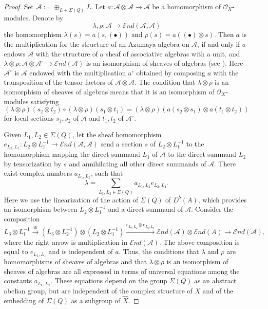 \documentclass[12pt]{amsart}
\numberwithin{equation}{subsection}
\theoremstyle{plain}
\theoremstyle{definition}
\newcommand{\A}{{\mathcal A}}
\newcommand{\IsomRightArrow}{\stackrel{\cong}{\rightarrow}}
\newcommand{\LongRightArrowOf}[1]{\stackrel{#1}{\longrightarrow}}
\newcommand{\StructureSheaf}[1]{{\mathcal O}_{#1}}
\newcommand{\SheafEnd}{{\mathcal E}nd}
\begin{document}
\begin{proof}
Set $\A:=\oplus_{L\in\Sigma(Q)}L$.
Let $a:\A\otimes\A\rightarrow \A$ be a homomorphism of $\StructureSheaf{X}$-modules. Denote by
\[
\lambda, \rho : \A \rightarrow \SheafEnd(\A,\A)
\]
the homomorphism $\lambda(s)=a(s,(\bullet))$ and $\rho(s)=a((\bullet)\otimes s)$. Then $a$ is the multiplication for the structure of an Azumaya algebra on $\A$, if and only if $a$ endows $\A$ with the structure of a sheaf of associative algebras with a unit, and  
$\lambda\otimes \rho:\A\otimes \A^{\circ}\rightarrow \SheafEnd(\A)$ is an isomorphism of sheaves of algebras (see \cite[Proposition IV.2.1]{milne}).
Here $\A^{\circ}$ is $\A$ endowed with the multiplication $a^\circ$ obtained by composing $a$ with the transposition of the tensor factors of $\A\otimes\A$. 
The condition that $\lambda\otimes\rho$ is an isomorphism of sheaves of algebras means that it is an isomorphism of $\StructureSheaf{X}$-modules satisfying 
\[
(\lambda\otimes \rho)(s_2\otimes t_2)\circ (\lambda\otimes \rho)(s_1\otimes t_1)=(\lambda\otimes \rho)(a(s_2\otimes s_1)\otimes a(t_1\otimes t_2))
\]
for local sections $s_1, s_2$ of $\A$ and $t_1, t_2$ of $\A^\circ$.

Given $L_1, L_2\in \Sigma(Q)$, let the sheaf homomorphism $e_{L_2,L_1}:L_2\otimes L_1^{-1}\rightarrow \SheafEnd(\A,\A)$ send a section $s$ of
$L_2\otimes L_1^{-1}$ to the homomorphism mapping the direct summand $L_1$ of $\A$  to the direct summand $L_2$ by tensorization by $s$ and annihilating all other direct summands of $\A$. 
There exist complex numbers $a_{L_1,L_2}$, such that 
\[
\lambda=
\sum_{L_1, L_2\in \Sigma(Q)} a_{L_1,L_2}e_{L_2,L_1}.
\]
Here we use the linearization of the action of $\Sigma(Q)$ of $D^b(A)$, which provides an isomorphism between $L_2\otimes L_1^{-1}$ and a direct summand of $\A$. Consider the composition 
\[
L_3\otimes L_1^{-1}\IsomRightArrow (L_3\otimes L_2^{-1})\otimes (L_2\otimes L_1^{-1}) \LongRightArrowOf{e_{L_3,L_2}\otimes e_{L_2,L_1}} \SheafEnd(\A)\otimes\SheafEnd(A)\rightarrow \SheafEnd(\A),
\]
where 
the right arrow is multiplication in $\SheafEnd(\A)$. The above composition is equal to $e_{L_3,L_1}$ and is independent of $a$.
Thus, the conditions that $\lambda$ and $\rho$ are homomorphisms of sheaves of algebras and that $\lambda\otimes\rho$ is an isomorphism of sheaves of algebras are all expressed in terms of universal equations among the constants $a_{L_1,L_2}$. These equations depend on the group $\Sigma(Q)$ as an abstract abelian group, but are independent of the complex structure of $X$ and of the embedding of $\Sigma(Q)$ as a subgroup of $\hat{X}$. 


\end{proof}
\end{document}
